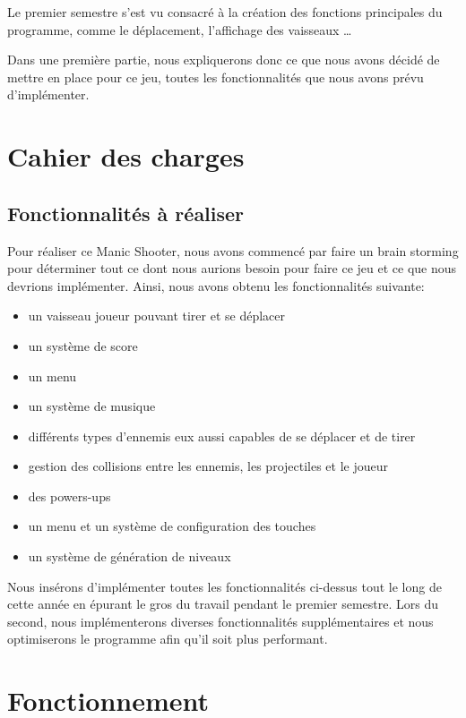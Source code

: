 \documentclass[a4paper, 12pt]{report}
\begin{document}
\noindent Le premier semestre s'est vu consacré à la création des fonctions principales
du programme, comme le déplacement, l'affichage des vaisseaux \ldots \newline

\noindent Dans une première partie, nous expliquerons donc ce que nous avons décidé de
mettre en place pour ce jeu, toutes les fonctionnalités que nous avons prévu
d'implémenter.

\chapter{Cahier des charges}
    \section{Fonctionnalités à réaliser}
Pour réaliser ce Manic Shooter, nous avons commencé par faire un brain
storming pour déterminer tout ce dont nous aurions besoin pour faire ce jeu et
ce que nous devrions implémenter. Ainsi, nous avons obtenu les fonctionnalités
suivante: \newline

\begin{itemize}
    \item un vaisseau joueur pouvant tirer et se déplacer
    \item un système de score
    \item un menu
    \item un système de musique
    \item différents types d'ennemis eux aussi capables de se déplacer et de tirer
    \item gestion des collisions entre les ennemis, les projectiles et le joueur
    \item des powers-ups
    \item un menu et un système de configuration des touches
    \item un système de génération de niveaux \newline
\end{itemize}

\noindent Nous insérons d'implémenter toutes les fonctionnalités ci-dessus tout le long
de cette année en épurant le gros du travail pendant le premier semestre. Lors
du second, nous implémenterons diverses fonctionnalités supplémentaires et nous
optimiserons le programme afin qu'il soit plus performant.

\chapter{Fonctionnement}
\end{document}
